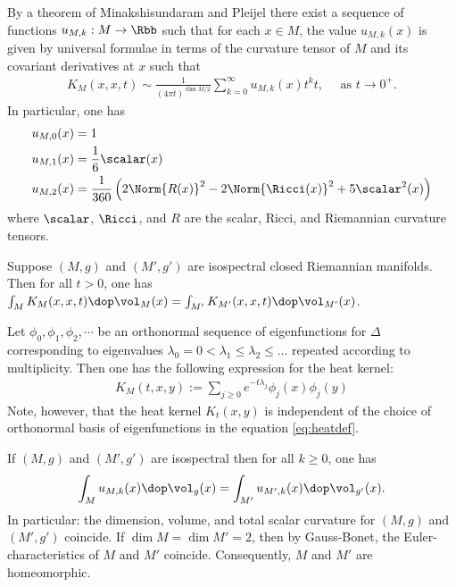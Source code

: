 By a theorem of Minakshisundaram and Pleijel \cite{Minakshisundaram.Pleijel-[PropertiesEigenfunctionsLaplaceoperator]1949} there exist a sequence of functions $u_{M,k} : M \to \Rbb$ such that for each $x \in M$, the value $u_{M,k}(x)$ is given by universal formulae in terms of the curvature tensor of $M$ and its covariant derivatives at $x$ such that
\begin{align}\label{eq:heatAsymptoticM}
  K_M(x,x,t) \sim \frac{1}{(4\pi t)^{\dim M /2 }} \sum_{k=0}^\infty u_{M,k}(x)t^k t, \quad \text{ as $t\to 0^+$.}
\end{align}
In particular, \cite[page 398]{Berger-[PanoramicViewRiemannian]2003} one has
\begin{align}
  u_{M,0} (x) & = 1                            \label{eq:heatzero}                                                     \\
  u_{M,1}(x)  & = \frac{1}{6} \label{eq:heatone}\scalar(x)                                                             \\
  u_{M,2}(x)  & = \frac{1}{360} \left( 2\Norm{R(x)}^2 -2 \Norm{\Ricci(x)}^2 +5 \scalar^2(x) \right) \label{eq:heattwo}
\end{align}
where $\scalar$, $\Ricci$, and $R$ are the scalar, Ricci, and Riemannian curvature tensors.

\begin{proposition}
  Suppose $(M,g)$ and $(M',g')$ are isospectral closed Riemannian manifolds.  Then for all $t>0$, one has $\int_M K_M(x,x,t) \dop \vol_M(x) = \int_{M'} K_{M'}(x,x,t)\dop \vol_{M'}(x)$.
\end{proposition}
Let $\phi_0,\phi_1,\phi_2,\cdots$ be an orthonormal sequence of eigenfunctions for $\Delta$ corresponding to eigenvalues $\lambda_0=0 <\lambda_1 \leq \lambda_2 \leq \dots$ repeated according to multiplicity.  Then one has the following expression for the heat kernel:
\begin{align}\label{eq:heatdef}
  K_M(t,x,y):= \sum_{j\geq 0} e^{-t\lambda_j} \phi_j(x)\phi_j(y)
\end{align}
Note, however, that the heat kernel $K_t(x,y)$ is independent of the choice of orthonormal basis of eigenfunctions in the equation \ref{eq:heatdef}.
\begin{corollary}
  If $(M,g)$ and $(M',g')$ are isospectral then for all $k\geq 0$, one has
  \begin{align}
    \int_M u_{M,k}(x) \dop \vol_g(x)  = \int_{M'} u_{M',k}(x) \dop \vol_{g'}(x).
  \end{align}
  In particular: the dimension, volume, and total scalar curvature for $(M,g)$ and $(M',g')$ coincide. If $\dim M = \dim M' = 2$, then by Gauss-Bonet, the Euler-characteristics of $M$ and $M'$ coincide.  Consequently, $M$ and $M'$ are homeomorphic.
\end{corollary}

